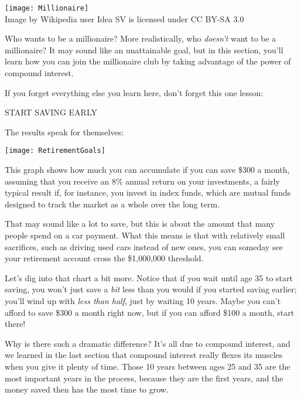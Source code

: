\setcounter{ExampleCounter}{1}
\begin{center}
\texttt{[image: Millionaire]}\\
\text{} \hfill {\small\color{gray}Image by Wikipedia user Idea SV is licensed under CC BY-SA 3.0}
\end{center}

Who wants to be a millionaire?  More realistically, who \emph{doesn't} want to be a millionaire?  It may sound like an unattainable goal, but in this section, you'll learn how you can join the millionaire club by taking advantage of the power of compound interest.

If you forget everything else you learn here, don't forget this one lesson:
\begin{center}
{\LARGE START SAVING EARLY}
\end{center}

The results speak for themselves:
\begin{center}
\texttt{[image: RetirementGoals]}
\end{center}

This graph shows how much you can accumulate if you can save \$300 a month, assuming that you receive an 8\% annual return on your investments, a fairly typical result if, for instance, you invest in index funds, which are mutual funds designed to track the market as a whole over the long term.

That may sound like a lot to save, but this is about the amount that many people spend on a car payment.  What this means is that with relatively small sacrifices, such as driving used cars instead of new ones, you can someday see your retirement account cross the \$1,000,000 threshold.

Let's dig into that chart a bit more.  Notice that if you wait until age 35 to start saving, you won't just save a \emph{bit} less than you would if you started saving earlier; you'll wind up with \emph{less than half}, just by waiting 10 years.  Maybe you can't afford to save \$300 a month right now, but if you can afford \$100 a month, start there!

Why is there such a dramatic difference?  It's all due to compound interest, and we learned in the last section that compound interest really flexes its muscles when you give it plenty of time.  Those 10 years between ages 25 and 35 are the most important years in the process, because they are the first years, and the money saved then has the most time to grow.

